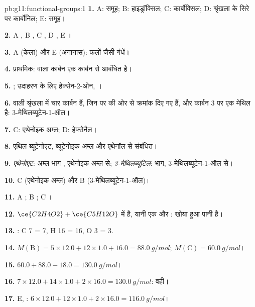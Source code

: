 \begin{solution}{pb:g11:functional-groups:1}
\textbf{1.} A:  समूह; B: हाइड्रॉक्सिल; C: कार्बोक्सिल; D: श्रृंखला के
सिरे पर कार्बोनिल; E:  समूह।

\textbf{2.} A , B , C , D , E ।

\textbf{3.} A (केला) और E (अनानास): फलों जैसी गंधें।

\textbf{4.} प्राथमिक:  वाला कार्बन एक कार्बन से आबंधित है।

\textbf{5.} ; उदाहरण के लिए हेक्सेन-2-ओन,
।

\textbf{6.}  वाली श्रृंखला में चार कार्बन हैं, जिन पर
 की ओर से क्रमांक दिए गए हैं, और कार्बन 3 पर एक मेथिल है: 3-मेथिलब्यूटेन-1-ऑल।

\textbf{7.} C: एथेनोइक अम्ल; D: हेक्सेनैल।

\textbf{8.} एथिल ब्यूटेनोएट, ब्यूटेनोइक अम्ल और एथेनॉल से संबंधित।

\textbf{9.} \emph{एथेनोएट}: अम्ल भाग , एथेनोइक
अम्ल से; \emph{3-मेथिलब्यूटिल}:  भाग, 3-मेथिलब्यूटेन-1-ऑल से।

\textbf{10.} C (एथेनोइक अम्ल) और B (3-मेथिलब्यूटेन-1-ऑल)।

\textbf{11.} A ; B ; C ।

\textbf{12.} $\ce{C2H4O2} + \ce{C5H12O}$ में  है, यानी एक
 और : खोया हुआ  पानी है।

\textbf{13.} : C 7 = 7, H 16 = 16,
O 3 = 3.

\textbf{14.} $M(\text{B}) = 5 \times 12.0 + 12 \times 1.0 + 16.0 =
\qty{88.0}{g/mol}$; $M(\text{C}) = \qty{60.0}{g/mol}$।

\textbf{15.} $60.0 + 88.0 - 18.0 = \qty{130.0}{g/mol}$।

\textbf{16.} $7 \times 12.0 + 14 \times 1.0 + 2 \times 16.0 =
\qty{130.0}{g/mol}$: वही।

\textbf{17.} E, : $6 \times 12.0 + 12 \times 1.0 + 2 \times
16.0 = \qty{116.0}{g/mol}$।


\end{solution}
